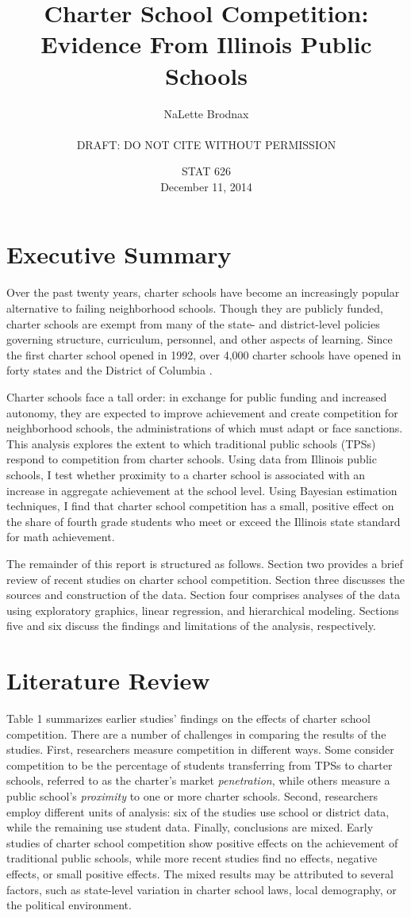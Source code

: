 \documentclass[11pt]{article}
\title{Charter School Competition: Evidence From Illinois Public Schools}
\author{NaLette Brodnax\\
\\
DRAFT: DO NOT CITE WITHOUT PERMISSION}
\date{STAT 626\\ December 11, 2014}
\begin{document}
\maketitle

\section{Executive Summary}
Over the past twenty years, charter schools have become an increasingly popular alternative to failing neighborhood schools.  Though they are publicly funded, charter schools are exempt from many of the state- and district-level policies governing structure, curriculum, personnel, and other aspects of learning.  Since the first charter school opened in 1992, over 4,000 charter schools have opened in forty states and the District of Columbia \citep{zimmer09}.

Charter schools face a tall order: in exchange for public funding and increased autonomy, they are expected to improve achievement and create competition for neighborhood schools, the administrations of which must adapt or face sanctions.  This analysis explores the extent to which traditional public schools (TPSs) respond to competition from charter schools.  Using data from Illinois public schools, I test whether proximity to a charter school is associated with an increase in aggregate achievement at the school level.  Using Bayesian estimation techniques, I find that charter school competition has a small, positive effect on the share of fourth grade students who meet or exceed the Illinois state standard for math achievement.

The remainder of this report is structured as follows.  Section two provides a brief review of recent studies on charter school competition.  Section three discusses the sources and construction of the data.  Section four comprises analyses of the data using exploratory graphics, linear regression, and hierarchical modeling.  Sections five and six discuss the findings and limitations of the analysis, respectively. 

\section{Literature Review}
Table 1 summarizes earlier studies' findings on the effects of charter school competition.  There are a number of challenges in comparing the results of the studies.  First, researchers measure competition in different ways.  Some consider competition to be the percentage of students transferring from TPSs to charter schools, referred to as the charter's market \textit{penetration}, while others measure a public school's \textit{proximity} to one or more charter schools. Second, researchers employ different units of analysis: six of the studies use school or district data, while the remaining use student data.  Finally, conclusions are mixed.  Early studies of charter school competition show positive effects on the achievement of traditional public schools, while more recent studies find no effects, negative effects, or small positive effects.  The mixed results may be attributed to several factors, such as state-level variation in charter school laws, local demography, or the political environment.
\end{document}
